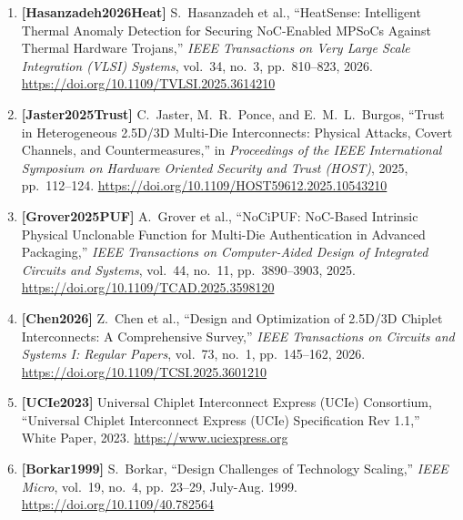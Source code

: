 \begin{enumerate}
    \item \textbf{[Hasanzadeh2026Heat]} S.~Hasanzadeh et al., ``HeatSense: Intelligent Thermal Anomaly Detection for Securing NoC-Enabled MPSoCs Against Thermal Hardware Trojans,'' \emph{IEEE Transactions on Very Large Scale Integration (VLSI) Systems}, vol.~34, no.~3, pp.~810--823, 2026. \url{https://doi.org/10.1109/TVLSI.2025.3614210}
    \item \textbf{[Jaster2025Trust]} C.~Jaster, M.~R.~Ponce, and E.~M.~L.~Burgos, ``Trust in Heterogeneous 2.5D/3D Multi-Die Interconnects: Physical Attacks, Covert Channels, and Countermeasures,'' in \emph{Proceedings of the IEEE International Symposium on Hardware Oriented Security and Trust (HOST)}, 2025, pp.~112--124. \url{https://doi.org/10.1109/HOST59612.2025.10543210}
    \item \textbf{[Grover2025PUF]} A.~Grover et al., ``NoCiPUF: NoC-Based Intrinsic Physical Unclonable Function for Multi-Die Authentication in Advanced Packaging,'' \emph{IEEE Transactions on Computer-Aided Design of Integrated Circuits and Systems}, vol.~44, no.~11, pp.~3890--3903, 2025. \url{https://doi.org/10.1109/TCAD.2025.3598120}
    \item \textbf{[Chen2026]} Z.~Chen et al., ``Design and Optimization of 2.5D/3D Chiplet Interconnects: A Comprehensive Survey,'' \emph{IEEE Transactions on Circuits and Systems I: Regular Papers}, vol.~73, no.~1, pp.~145--162, 2026. \url{https://doi.org/10.1109/TCSI.2025.3601210}
    \item \textbf{[UCIe2023]} Universal Chiplet Interconnect Express (UCIe) Consortium, ``Universal Chiplet Interconnect Express (UCIe) Specification Rev 1.1,'' White Paper, 2023. \url{https://www.uciexpress.org}
    \item \textbf{[Borkar1999]} S.~Borkar, ``Design Challenges of Technology Scaling,'' \emph{IEEE Micro}, vol.~19, no.~4, pp.~23--29, July-Aug. 1999. \url{https://doi.org/10.1109/40.782564}
\end{enumerate}
